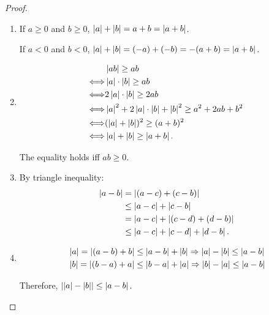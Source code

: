 \documentclass[class=understanding-analysis,crop=false]{standalone}
\begin{document}
\begin{proof}
    \begin{enumerate}[label = (\alph*)]
        \item If $a\ge 0$ and $b\ge 0$, $\left\vert{a}\right\vert + \left\vert{b}\right\vert = a + b = \left\vert{a + b}\right\vert$.
            \par If $a < 0$ and $b < 0$, $\left\vert{a}\right\vert + \left\vert{b}\right\vert = (-a) + (-b) = -(a + b) = \left\vert{a+b}\right\vert$.
        \item
            \begin{align*}
                &\left\vert{ab}\right\vert \ge ab \\
                \Longleftrightarrow& \left\vert{a}\right\vert\cdot\left\vert{b}\right\vert \ge ab \\
                \Longleftrightarrow& 2\left\vert{a}\right\vert\cdot\left\vert{b}\right\vert \ge 2ab \\
                \Longleftrightarrow& \left\vert{a}\right\vert^{2} + 2\left\vert{a}\right\vert\cdot\left\vert{b}\right\vert + \left\vert{b}\right\vert^{2} \ge a^{2} + 2ab + b^{2} \\
                \Longleftrightarrow& (\left\vert{a}\right\vert + \left\vert{b}\right\vert){}^{2} \ge (a+b){}^{2} \\
                \Longleftrightarrow& \left\vert{a}\right\vert + \left\vert{b}\right\vert \ge \left\vert{a + b}\right\vert.
            \end{align*}
            \par The equality holds iff $ab\ge 0$.
        \item By triangle inequality:
            \begin{align*}
                \left\vert{a - b}\right\vert & = \left\vert{(a - c) + (c - b)}\right\vert \\
                            & \le \left\vert{a - c}\right\vert + \left\vert{c - b}\right\vert \\
                            & = \left\vert{a - c}\right\vert + \left\vert{(c - d) + (d - b)}\right\vert \\
                            & \le \left\vert{a - c}\right\vert + \left\vert{c - d}\right\vert + \left\vert{d - b}\right\vert.
            \end{align*}
        \item
            \begin{align*}
                & \left\vert{a}\right\vert = \left\vert{(a - b) + b}\right\vert \le \left\vert{a - b}\right\vert + \left\vert{b}\right\vert \Rightarrow \left\vert{a}\right\vert - \left\vert{b}\right\vert \le \left\vert{a - b}\right\vert \\
                & \left\vert{b}\right\vert = \left\vert{(b - a) + a}\right\vert \le \left\vert{b - a}\right\vert + \left\vert{a}\right\vert \Rightarrow \left\vert{b}\right\vert - \left\vert{a}\right\vert \le \left\vert{a - b}\right\vert
            \end{align*}
            \par Therefore, $\left\vert{\left\vert{a}\right\vert - \left\vert{b}\right\vert}\right\vert\le \left\vert{a - b}\right\vert$.
    \end{enumerate}
\end{proof}
\end{document}
